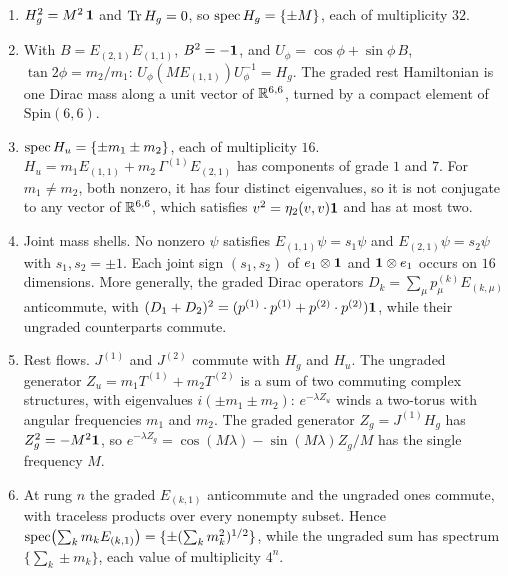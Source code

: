\begin{proposition}
\label{e1:prop:rest}
\begin{enumerate}[label=(\roman*),leftmargin=2.2em]
\item $H_g^2=M^2\,\mathbf 1$ and $\operatorname{Tr} H_g=0$, so $\operatorname{spec} H_g=\{\pm M\}$, each of multiplicity $32$.
\item With $B=E_{(2,1)}E_{(1,1)}$, $B^2=-\mathbf 1$, and $U_\phi=\cos\phi+\sin\phi\,B$, $\tan2\phi=m_2/m_1$: $U_\phi(ME_{(1,1)})U_\phi^{-1}=H_g$. The graded
rest Hamiltonian is one Dirac mass along a unit vector of $\mathbb{R}^{6,6}$, turned by a compact element of $\mathrm{Spin}(6,6)$.
\item $\operatorname{spec} H_u=\{\pm m_1\pm m_2\}$, each of multiplicity $16$. $H_u=m_1E_{(1,1)}+m_2\,\Gamma^{(1)}E_{(2,1)}$ has components of grade $1$ and $7$.
For $m_1\neq m_2$, both nonzero, it has four distinct eigenvalues, so it is not conjugate to any vector of $\mathbb{R}^{6,6}$, which satisfies
$v^2=\eta_2(v,v)\mathbf 1$ and has at most two.
\item Joint mass shells. No nonzero $\psi$ satisfies $E_{(1,1)}\psi=s_1\psi$ and $E_{(2,1)}\psi=s_2\psi$ with $s_1,s_2=\pm1$. Each joint sign
$(s_1,s_2)$ of $e_1\otimes\mathbf 1$ and $\mathbf 1\otimes e_1$ occurs on $16$ dimensions. More generally, the graded Dirac operators
$D_k=\sum_\mu p^{(k)}_\mu E_{(k,\mu)}$ anticommute, with $(D_1+D_2)^2=(p^{(1)}\cdot p^{(1)}+p^{(2)}\cdot p^{(2)})\mathbf 1$, while their ungraded
counterparts commute.
\item Rest flows. $J^{(1)}$ and $J^{(2)}$ commute with $H_g$ and $H_u$. The ungraded generator $Z_u=m_1T^{(1)}+m_2T^{(2)}$ is a sum of two commuting
complex structures, with eigenvalues $i(\pm m_1\pm m_2)$: $e^{-\lambda Z_u}$ winds a two-torus with angular frequencies $m_1$ and $m_2$. The
graded generator $Z_g=J^{(1)}H_g$ has $Z_g^2=-M^2\mathbf 1$, so $e^{-\lambda Z_g}=\cos(M\lambda)-\sin(M\lambda)Z_g/M$ has the single frequency $M$.
\item At rung $n$ the graded $E_{(k,1)}$ anticommute and the ungraded ones commute, with traceless products over every nonempty subset. Hence
$\operatorname{spec}\bigl(\sum_km_kE_{(k,1)}\bigr)=\{\pm(\sum_km_k^2)^{1/2}\}$, while the ungraded sum has spectrum $\{\sum_k\pm m_k\}$, each value of
multiplicity $4^n$.
\end{enumerate}
\end{proposition}

